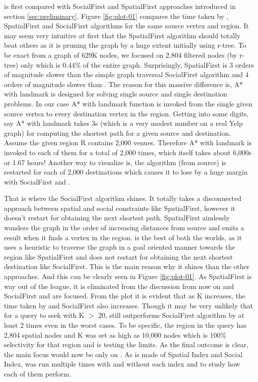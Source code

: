 {\rrp} is first compared with SocialFirst and SpatialFirst approaches introduced in section \ref{sec:preliminary}. Figure \ref{fig:plot-01} compares the time taken by {\rrp}, SpatialFirst and SocialFirst algorithms for the same source vertex and region. It may seem very intuitive at first that the SpatialFirst algorithm should totally beat others as it is pruning the graph by a huge extent initially using r-tree. To be exact from a graph of 629K nodes, we focused on 2,804 filtered nodes (by r-tree) only which is 0.44\% of the entire graph. Surprisingly, SpatialFirst is 3 orders of magnitude slower than the simple graph traversal SocialFirst algorithm and 4 orders of magnitude slower than {\rrp}. The reason for this massive difference is, A* with landmark is designed for solving single source and single destination problems. In our case A* with landmark function is invoked from the single given source vertex to every destination vertex in the region. Getting into some digits, say A* with landmark takes 3s (which is a very modest number on a real Yelp graph) for computing the shortest path for a given source and destination. Assume the given region R contains 2,000 venues. Therefore A* with landmark is invoked to each of them for a total of 2,000 times, which itself takes about 6,000s or 1.67 hours! Another way to visualize is, the algorithm (from source) is restarted for each of 2,000 destinations which causes it to lose by a huge margin with SocialFirst and {\rrp}.

That is where the SocialFirst algorithm shines. It totally takes a disconnected approach between spatial and social constraints like SpatialFirst, however it doesn't restart for obtaining the next shortest path. SpatialFirst aimlessly wanders the graph in the order of increasing distances from source and emits a result when it finds a vertex in the region. {\rrp} is the best of both the worlds, as it uses a heuristic to traverse the graph in a goal oriented manner towards the region like SpatialFirst and does not restart for obtaining the next shortest destination like SocialFirst. This is the main reason why it shines than the other approaches. And this can be clearly seen in Figure \ref{fig:plot-01}. As SpatialFirst is way out of the league, it is eliminated from the discussion from now on and SocialFirst and {\rrp} are focused. From the plot it is evident that as K increases, the time taken  by {\rrp} and SocialFirst also increases. Though it may be very unlikely that for a query to seek with K $>$ 20, {\rrp} still outperforms SocialFirst algorithm by at least 2 times even in the worst cases. To be specific, the region in the query has 2,804 spatial nodes and K was set as high as 10,000 nodes which is 100\% selectivity for that region and is testing the limits. As the final outcome is clear, the main focus would now be only on {\rrp}. As {\rrp} is made of Spatial Index and Social Index, {\rrp} was run multiple times with and without each index and to study how each of them perform.

